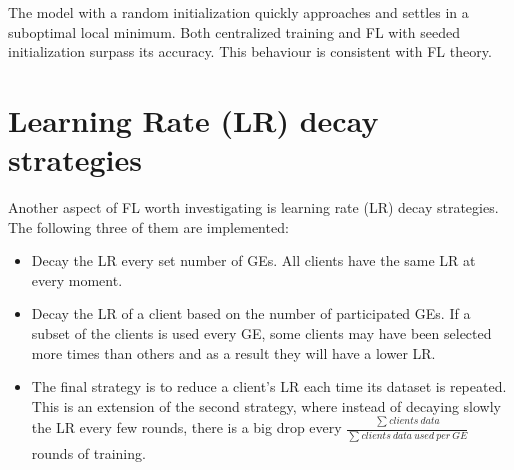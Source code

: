 The model with a random initialization quickly approaches and settles in a suboptimal local minimum. Both centralized training and FL with seeded initialization surpass its accuracy. This behaviour is consistent with FL theory.

\section{Learning Rate (LR) decay strategies}
Another aspect of FL worth investigating is learning rate (LR) decay strategies. The following three of them are implemented:
\begin{itemize}
    \item Decay the LR every set number of GEs. All clients have the same LR at every moment.
    \item Decay the LR of a client based on the number of participated GEs. If a subset of the clients is used every GE, some clients may have been selected more times than others and as a result they will have a lower LR.
    \item The final strategy is to reduce a client's LR each time its dataset is repeated. This is an extension of the second strategy, where instead of decaying slowly the LR every few rounds, there is a big drop every \( \displaystyle \frac{\sum_{}^{}clients\ data}{\sum_{}^{} clients\ data\ used\ per\ GE} \) rounds of training.
\end{itemize}

\begin{table}[H]
    \center
    \hspace*{-9mm} 
    \caption[Experiment 7 parameters]{Experiment 7 parameters}
    \label{table:Experiment 7 parameters}
\end{table}

